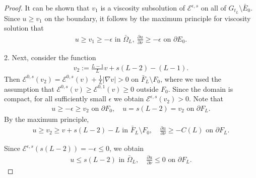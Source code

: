 \documentclass[11pt, letterpaper]{amsart}
\theoremstyle{definition}
\theoremstyle{remark}
\begin{document}
\begin{appendix}
\begin{proof}
	It can be shown that $v_1$ is a viscosity subsolution of $\mathcal{E}^{\epsilon ,s}$ on all of $G_{t_L}\setminus \bar{E}_0$. Since $u \geq v_1$ on the boundary, it follows by the maximum principle for viscosity solution that 
	\begin{align}\label{v1-lower}
		u \geq v_1 \geq -\epsilon \text{ in } \bar{\Omega }_{L},\ \frac{\partial u}{\partial \nu } \geq - \epsilon \text{ on }\partial E_0.
	\end{align} 

2. Next, consider the function
\begin{align*}
	v_2:= \frac{L-1}{L} v + s(L-2) - (L-1).
\end{align*} 
Then $\mathcal{E}^{0,s}(v_2) = \mathcal{E}^{0,s}(v) + \frac{1}{L}|\nabla v| >0$ on $\bar{F}_{L} \setminus F_0$, where we used the assumption that $\mathcal{E}^{0,s}(v) \geq \mathcal{E}^{0,1}(v) \geq 0$ outside $F_0$. Since the domain is compact, for all sufficiently small $\epsilon $ we obtain $\mathcal{E}^{\epsilon ,s}(v_2) >0$. Note that
\begin{align*}
	u \geq - \epsilon \geq v_2 \text{ on } \partial F_0,\quad u= s(L-2) = v_2 \text{ on } \partial F_L.
\end{align*} 
By the maximum principle, 
\begin{align}\label{v2-lower}
	u \geq v_2 \geq v+ s(L-2) - L \text{ in } \bar{F}_{L}\setminus F_0,\quad \frac{\partial u}{\partial \nu } \geq - C(L) \text{ on } \partial F_L.
\end{align}

Since $\mathcal{E}^{\epsilon ,s}(s(L-2) ) = - \epsilon \leq 0$, we obtain
\begin{align}
	u \leq s(L-2) \text{ in } \bar{\Omega }_{L},\quad \frac{\partial u}{\partial \nu } \leq 0 \text{ on } \partial F_{L}.
\end{align}


\end{proof}
\end{appendix}
\end{document}
